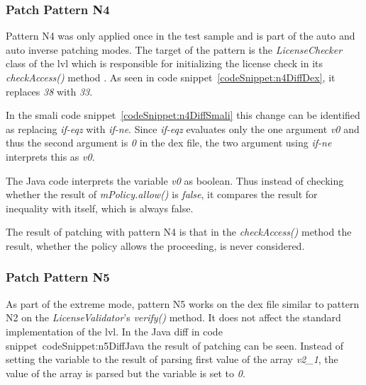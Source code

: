 \subsubsection{Patch Pattern N4}
Pattern N4 was only applied once in the test sample and is part of the auto and auto inverse patching modes.
The target of the pattern is the \textit{LicenseChecker} class of the \gls{lvl} which is responsible for initializing the license check in its \textit{checkAccess()} method \cite{developersLicensingReference}.
\newline
As seen in code snippet~\ref{codeSnippet:n4DiffDex}, it replaces \textit{38} with \textit{33}.
\newline

In the smali code snippet~\ref{codeSnippet:n4DiffSmali} this change can be identified as replacing \textit{if-eqz} with \textit{if-ne}.
Since \textit{if-eqz} evaluates only the one argument \textit{v0} and thus the second argument is \textit{0} in the \gls{dex} file, the two argument using \textit{if-ne} interprets this as \textit{v0}.
\newline

The Java code interprets the variable \textit{v0} as boolean.
Thus instead of checking whether the result of \textit{mPolicy.allow()} is \textit{false}, it compares the result for inequality with itself, which is always false.
\newline



The result of patching with pattern N4 is that in the \textit{checkAccess()} method the result, whether the policy allows the proceeding, is never considered.


\subsubsection{Patch Pattern N5}
As part of the extreme mode, pattern N5 works on the \gls{dex} file similar to pattern N2 on the \textit{LicenseValidator}'s \textit{verify()} method.
It does not affect the standard implementation of the \gls{lvl}.
\newline
In the Java diff in code snippet~{codeSnippet:n5DiffJava} the result of patching can be seen.
Instead of setting the variable to the result of parsing first value of the array \textit{v2\_1}, the value of the array is parsed but the variable is set to \textit{0}.
\newline


